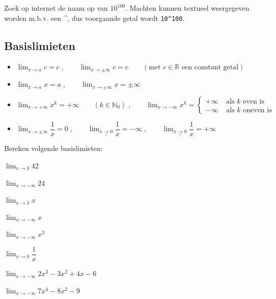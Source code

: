 \documentclass[12pt,twoside,a4paper]{article}
\begin{document}
Zoek op internet de naam op van $10^{100}$. Machten kunnen textueel weergegeven worden m.b.v. een \textasciicircum, dus voorgaande getal wordt \texttt{10\textasciicircum 100}.

\subsection{Basislimieten}

\begin{itemize}
\item $\displaystyle\lim_{x\to a}c=c\;,\qquad\lim_{x\to \pm\infty}c=c\qquad (\mbox{met } c\in\mathbb{R}\mbox{ een constant getal})$
\item $\displaystyle\lim_{x\to a}x=a\;,\qquad\lim_{x\to \pm\infty}x=\pm\infty$
\item $\displaystyle\lim_{x\to+\infty}x^k = +\infty\qquad(k\in\mathbb{N}_0)\;,\qquad \displaystyle\lim_{x\to-\infty}x^k = \begin{cases}+\infty &\mbox{ als $k$ even is}\\-\infty &\mbox{ als $k$ oneven is} \end{cases}$
\item $\displaystyle\lim_{x\to\pm\infty}\dfrac{1}{x}=0\;,\qquad\lim_{x\underset{<}{\to}0}\dfrac{1}{x}=-\infty\;,\qquad \displaystyle\lim_{x\underset{>}{\to}0}\dfrac{1}{x}=+\infty$
\end{itemize}

\begin{oefening}
  Bereken volgende basislimieten:
  \begin{exlist}{2}
  \item $\displaystyle \lim_{x\to 3}42$
  \item $\displaystyle \lim_{x\to -\infty}24$
  \item $\displaystyle \lim_{x\to 3}x$
  \item $\displaystyle \lim_{x\to -\infty}x$
  \item $\displaystyle \lim_{x\to -\infty}x^3$
  \item $\displaystyle \lim_{x\to 0}\dfrac{1}{x}$
  \item $\displaystyle \lim_{x\to -\infty}2x^3-3x^2+4x-6$
  \item $\displaystyle \lim_{x\to -\infty}7x^4-8x^2-9$
  \end{exlist}
\end{oefening}
\end{document}
